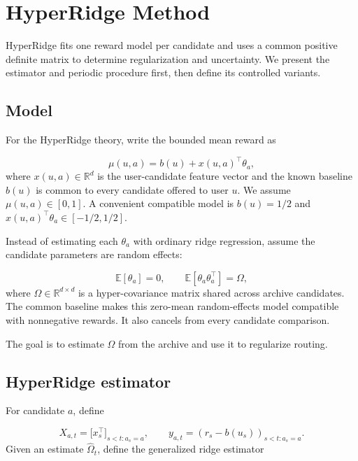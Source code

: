 \documentclass{article} %
\begin{document}
\section{HyperRidge Method}
\label{sec:method}

HyperRidge fits one reward model per candidate and uses a common positive
definite matrix to determine regularization and uncertainty. We present the
estimator and periodic procedure first, then define its controlled variants.

\subsection{Model}
\label{sec:method-model}

For the HyperRidge theory, write the bounded mean reward as

\begin{equation}
\mu(u,a)=b(u)+x(u,a)^\top\theta_a ,
\end{equation}
where $x(u,a)\in\mathbb{R}^d$ is the user-candidate feature vector and the known baseline $b(u)$ is common to every candidate offered to user $u$. We assume $\mu(u,a)\in[0,1]$. A convenient compatible model is $b(u)=1/2$ and $x(u,a)^\top\theta_a\in[-1/2,1/2]$.

Instead of estimating each $\theta_a$ with ordinary ridge regression, assume
the candidate parameters are random effects:

\begin{equation}
\mathbb{E}[\theta_a]=0,\qquad
\mathbb{E}[\theta_a\theta_a^\top]=\Omega,
\end{equation}
where $\Omega \in \mathbb{R}^{d \times d}$ is a hyper-covariance matrix shared
across archive candidates. The common baseline makes this zero-mean random-effects model compatible with nonnegative rewards. It also cancels from every candidate comparison.

The goal is to estimate $\Omega$ from the archive and use it to regularize
routing.

\subsection{HyperRidge estimator}

For candidate $a$, define

\begin{equation}
X_{a,t} = \bigl[ x_s^\top \bigr]_{s < t : a_s = a}, \qquad
y_{a,t} = (r_s-b(u_s))_{s < t : a_s = a}.
\end{equation}
Given an estimate $\widehat{\Omega}_t$, define the generalized ridge estimator
\end{document}
